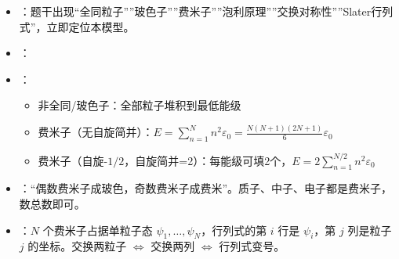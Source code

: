 \begin{tipbox}[快速识别与解题技巧]
\begin{itemize}
    \item {}：题干出现``全同粒子''''玻色子''''费米子''''泡利原理''''交换对称性''''Slater行列式''，立即定位本模型。
    \item {}：
    \begin{center}
    \end{center}
    \item {}：
    \begin{itemize}[nosep]
        \item 非全同/玻色子：全部粒子堆积到最低能级
        \item 费米子（无自旋简并）：$E=\sum_{n=1}^Nn^2\varepsilon_0=\frac{N(N+1)(2N+1)}{6}\varepsilon_0$
        \item 费米子（自旋-$1/2$，自旋简并=2）：每能级可填2个，$E=2\sum_{n=1}^{N/2}n^2\varepsilon_0$
    \end{itemize}
    \item {}：``偶数费米子成玻色，奇数费米子成费米''。质子、中子、电子都是费米子，数总数即可。
    \item {}：$N$ 个费米子占据单粒子态 $\psi_1,\ldots,\psi_N$，行列式的第 $i$ 行是 $\psi_i$，第 $j$ 列是粒子 $j$ 的坐标。交换两粒子 $\Leftrightarrow$ 交换两列 $\Leftrightarrow$ 行列式变号。
\end{itemize}
\end{tipbox}

